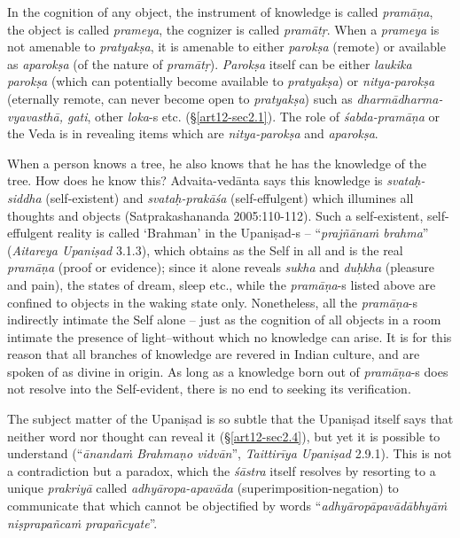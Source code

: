 In the cognition of any object, the instrument of knowledge is called {\sl pramāṇa}, the object is called {\sl prameya}, the cognizer is called {\sl pramātṛ}. When a {\sl prameya} is not amenable to {\sl pratyakṣa}, it is amenable to either {\sl parokṣa} (remote) or available as {\sl aparokṣa} (of the nature of {\sl pramātṛ}). {\sl Parokṣa} itself can be either {\sl laukika parokṣa} (which can potentially become available to {\sl pratyakṣa}) or {\sl nitya-parokṣa} (eternally remote, can never become open to {\sl pratyakṣa}) such as {\sl dharmādharma-vyavasthā, gati}, other {\sl loka}-s etc. (\S\ref{art12-sec2.1}). The role of {\sl śabda-pramāṇa} or the Veda is in revealing items which are {\sl nitya-parokṣa} and {\sl aparokṣa}.

When a person knows a tree, he also knows that he has the knowledge of the tree. How does he know this? Advaita-vedānta says this knowledge is {\sl svataḥ-siddha} (self-existent) and {\sl svataḥ-prakāśa} (self-effulgent) which illumines all thoughts and objects (Satprakashananda 2005:110-112). Such a self-existent, self-effulgent reality is called `Brahman' in the Upaniṣad-s -- ``{\sl prajñānaṁ brahma}'' ({\sl Aitareya Upaniṣad} 3.1.3), which obtains as the Self in all and is the real {\sl pramāṇa} (proof or evidence); since it alone reveals {\sl sukha} and {\sl duḥkha} (pleasure and pain), the states of dream, sleep etc., while the {\sl pramāṇa}-s listed above are conﬁned to objects in the waking state only. Nonetheless, all the {\sl pramāṇa}-s indirectly intimate the Self alone -- just as the cognition of all objects in a room intimate the presence of light--without which no knowledge can arise. It is for this reason that all branches of knowledge are revered in Indian culture, and are spoken of as divine in origin. As long as a knowledge born out of {\sl pra\-mā\-ṇa}-s does not resolve into the Self-evident, there is no end to seeking its veriﬁcation.

The subject matter of the Upaniṣad is so subtle that the Upaniṣad itself says that neither word nor thought can reveal it (\S\ref{art12-sec2.4}), but yet it is possible to understand (``{\sl ānandaṁ Brahmaṇo vidvān}'', {\sl Taittirīya Upaniṣad} 2.9.1). This is not a contradiction but a paradox, which the {\sl śāstra} itself resolves by resorting to a unique {\sl prakriyā} called {\sl adhyāropa-apavāda} (superimposition-negation) to communicate that which cannot be objectiﬁed by words ``{\sl adhyāropāpavādābhyāṁ niṣprapañcaṁ prapañcyate}''. 

